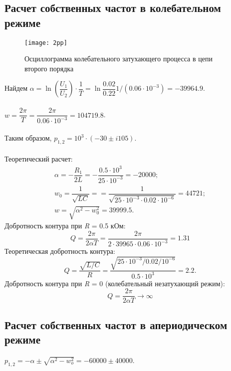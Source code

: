 \documentclass[a4paper,14pt ]{article} %
\begin{document}
\subsection{Расчет собственных частот в колебательном режиме} 
\begin{figure}[H]
    \centering
    \texttt{[image: 2pp]}
    \caption{\centering Осциллограмма колебательного затухающего процесса в цепи второго порядка}
\end{figure}
Найдем $\alpha = \ln\left(\dfrac{U_1}{U_2}\right)\cdot\dfrac1T = \ln\dfrac{0.02}{0.22}
1/(0.06\cdot10^{-3}) = -39964.9
$.
\\\\
 $w = \dfrac{2\pi}{T} = \dfrac{2\pi}{0.06\cdot10^{-3}} = 104719.8$.
\\\\
\indent Таким образом, $p_{1,2} = 10^3\cdot(-30 \pm i105)$.
\\\\ 
\indent Теоретический расчет: 
\begin{multline*}
    \alpha = -\dfrac{R_1}{2L} 
= -\dfrac{0.5\cdot10^3}{25\cdot10^{-3}} = -20000;\\ 
w_0 =\dfrac1{\sqrt{LC}} = 
= \dfrac{1}{\sqrt{25\cdot10^{-3}\cdot0.02\cdot10^{-6}}} =  44721; \\w = 
\sqrt{\alpha^2 - w_0^2} = 39999.5. 
\end{multline*}
\indent Добротность контура при {\it R} = 0.5 кОм:
\begin{equation*}
    Q=\frac{2\pi}{2\alpha T} = \frac{2\pi}{2\cdot39965\cdot 0.06 \cdot 10^{-3}}=
    1.31
\end{equation*}
\indent Теоретическая добротность контура: 
\begin{equation*}
    Q = \frac{\sqrt{L/C}}{R} = \dfrac{\sqrt{25\cdot10^{-3}/0.02/10^{-6}}}{0.5\cdot10^3} = 2.2.
\end{equation*}
\indent Добротность контура при {\it R} = 0 (колебательный незатухающий режим):
\begin{equation*}
    Q = \frac{2\pi}{2\alpha T} \to \infty
\end{equation*}
\subsection{Расчет собственных частот в апериодическом режиме}
$p_{1,2} = -\alpha \pm \sqrt{\alpha^2 - w_o^2} = -60000 \pm 40000$. 
\end{document}
